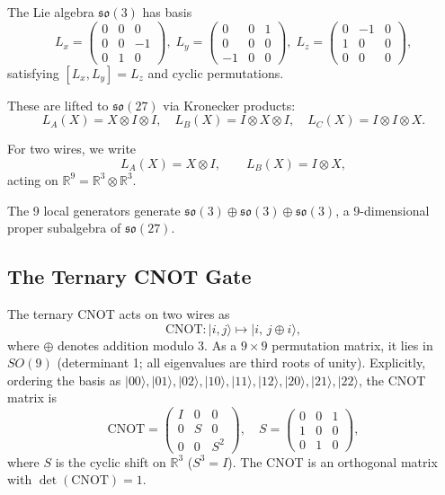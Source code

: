 \documentclass[12pt,a4paper]{article}
\begin{document}
The Lie algebra $\mathfrak{so}(3)$ has basis
\[
L_x = \begin{pmatrix}0&0&0\\0&0&-1\\0&1&0\end{pmatrix},\;
L_y = \begin{pmatrix}0&0&1\\0&0&0\\-1&0&0\end{pmatrix},\;
L_z = \begin{pmatrix}0&-1&0\\1&0&0\\0&0&0\end{pmatrix},
\]
satisfying $[L_x, L_y] = L_z$ and cyclic permutations.

These are lifted to $\mathfrak{so}(27)$ via Kronecker products:
\[
L_{A}(X) = X \otimes I \otimes I,\quad
L_{B}(X) = I \otimes X \otimes I,\quad
L_{C}(X) = I \otimes I \otimes X.
\]

For two wires, we write
\[
L_{A}(X) = X \otimes I,\qquad
L_{B}(X) = I \otimes X,
\]
acting on $\mathbb{R}^9 = \mathbb{R}^3 \otimes \mathbb{R}^3$.

The 9 local generators generate $\mathfrak{so}(3) \oplus \mathfrak{so}(3)
\oplus \mathfrak{so}(3)$, a 9-dimensional proper subalgebra of
$\mathfrak{so}(27)$.

\subsection{The Ternary CNOT Gate}

The ternary CNOT acts on two wires as
\[
\text{CNOT}: |i,j\rangle \mapsto |i,\, j \oplus i\rangle,
\]
where $\oplus$ denotes addition modulo 3. As a $9 \times 9$ permutation
matrix, it lies in $SO(9)$ (determinant 1; all eigenvalues are third roots
of unity). Explicitly, ordering the basis as
$|00\rangle,|01\rangle,|02\rangle,|10\rangle,|11\rangle,|12\rangle,
|20\rangle,|21\rangle,|22\rangle$, the CNOT matrix is
\[
\text{CNOT} = \begin{pmatrix}
I & 0 & 0 \\
0 & S & 0 \\
0 & 0 & S^2
\end{pmatrix},
\quad
S = \begin{pmatrix}0&0&1\\1&0&0\\0&1&0\end{pmatrix},
\]
where $S$ is the cyclic shift on $\mathbb{R}^3$ ($S^3 = I$). The CNOT is
an orthogonal matrix with $\det(\text{CNOT}) = 1$.
\end{document}
